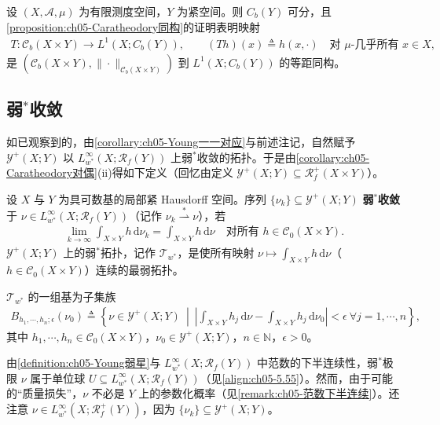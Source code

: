 \documentclass[../../main.tex]{subfiles}%
\begin{document}
\begin{remark}\label{remark:ch05-紧空间同构}
设 $(X,\mathcal{A},\mu)$ 为有限测度空间，$Y$ 为紧空间。则 $C_b(Y)$ 可分，且\cref{proposition:ch05-Caratheodory同构}的证明表明映射
\begin{align}
T:\mathcal{C}_b(X\times Y)\to L^1(X;C_b(Y)),\qquad
(Th)(x)\triangleq h(x,\cdot)
\quad\text{对 }\mu\text{-几乎所有 }x\in X,\label{align:ch05-5.59}
\end{align}
是 $(\mathcal{C}_b(X\times Y),\|\cdot\|_{\mathcal{C}_b(X\times Y)})$ 到 $L^1(X;C_b(Y))$ 的等距同构。
\end{remark}

\subsection{弱$^*$收敛}\label{subsection:ch05-Young弱星}

如已观察到的，由\cref{corollary:ch05-Young一一对应}与前述注记，自然赋予 $\mathcal{Y}^+(X;Y)$ 以 $L^\infty_{w^*}(X;\mathscr{R}_f(Y))$ 上弱$^*$收敛的拓扑。于是由\cref{corollary:ch05-Caratheodory对偶}(ii)得如下定义（回忆由定义 $\mathcal{Y}^+(X;Y)\subseteq\mathscr{R}^+_f(X\times Y)$）。

\begin{definition}\label{definition:ch05-Young弱星}
设 $X$ 与 $Y$ 为具可数基的局部紧 Hausdorff 空间。序列 $\{\nu_k\}\subseteq\mathcal{Y}^+(X;Y)$ \textbf{弱$^*$收敛}于 $\nu\in L^\infty_{w^*}(X;\mathscr{R}_f(Y))$（记作 $\nu_k\stackrel{*}{\rightharpoonup}\nu$），若
\begin{align*}
\lim_{k\to\infty}\int_{X\times Y}h\,\mathrm{d}\nu_k
=\int_{X\times Y}h\,\mathrm{d}\nu
\quad\text{对所有 }h\in\mathcal{C}_0(X\times Y).
\end{align*}
$\mathcal{Y}^+(X;Y)$ 上的弱$^*$拓扑，记作 $\mathcal{T}_{w^*}$，是使所有映射 $\nu\mapsto\int_{X\times Y}h\,\mathrm{d}\nu$（$h\in\mathcal{C}_0(X\times Y)$）连续的最弱拓扑。

$\mathcal{T}_{w^*}$ 的一组基为子集族
\begin{align}
B_{h_1,\cdots ,h_n;\epsilon}(\nu_0)
\triangleq \left\{\nu\in\mathcal{Y}^+(X;Y)\ \middle|\
\left|\int_{X\times Y}h_j\,\mathrm{d}\nu-\int_{X\times Y}h_j\,\mathrm{d}\nu_0\right|<\epsilon
\ \forall j=1,\cdots ,n\right\},\label{align:ch05-5.60}
\end{align}
其中 $h_1,\cdots ,h_n\in\mathcal{C}_0(X\times Y)$，$\nu_0\in\mathcal{Y}^+(X;Y)$，$n\in\mathbb{N}$，$\epsilon>0$。
\end{definition}

\begin{remark}\label{remark:ch05-弱星损失质量}
由\cref{definition:ch05-Young弱星}与 $L^\infty_{w^*}(X;\mathscr{R}_f(Y))$ 中范数的下半连续性，弱$^*$极限 $\nu$ 属于单位球 $U\subseteq L^\infty_{w^*}(X;\mathscr{R}_f(Y))$（见\eqref{align:ch05-5.55}）。然而，由于可能的“质量损失”，$\nu$ 不必是 $Y$ 上的参数化概率（见\cref{remark:ch05-范数下半连续}）。还注意 $\nu\in L^\infty_{w^*}(X;\mathscr{R}^+_f(Y))$，因为 $\{\nu_k\}\subseteq\mathcal{Y}^+(X;Y)$。
\end{remark}
\end{document}
